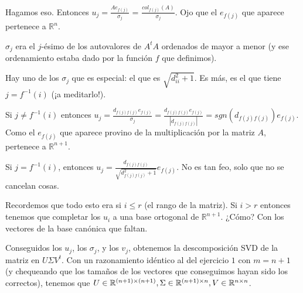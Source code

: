 \documentclass[10pt,a4paper,final]{article}
\begin{document}
Hagamos eso. Entonces $u_j = \frac{A e_{f(j)}}{\sigma_j}$ = $\frac{col_{f(j)}(A)}{\sigma_j}$. Ojo que el $e_{f(j)}$ que aparece pertenece a $\mathbb{R}^n$.

$\sigma_j$ era el $j$-ésimo de los autovalores de $A^t A$ ordenados de mayor a menor (y ese ordenamiento estaba dado por la función $f$ que definimos).

Hay uno de los $\sigma_j$ que es especial: el que es $\sqrt{d_{ii}^2+1}$. Es más, es el que tiene $j= f^{-1}(i)$ (¡a meditarlo!).

Si $j \neq f^{-1}(i)$ entonces $u_j = \frac{d_{f(j)f(j)} e_{f(j)}}{\sigma_j} = \frac{d_{f(j)f(j)} e_{f(j)}}{|d_{f(j)f(j)}|} = sgn(d_{f(j) f(j)}) e_{f(j)}$. Como el $e_{f(j)}$ que aparece provino de la multiplicación por la matriz $A$, pertenece a $\mathbb{R}^{n+1}$.


Si $j= f^{-1}(i)$, entonces $u_j = \frac{d_{f(j)f(j)} }{\sqrt{d_{f(j)f(j)}^2+1}} e_{f(j)}$. No es tan feo, solo que no se cancelan cosas.


Recordemos que todo esto era si $i \leq r$ (el rango de la matriz). Si $i>r$ entonces tenemos que completar los $u_i$ a una base ortogonal de $\mathbb{R}^{n+1}$. ¿Cómo? Con los vectores de la base canónica que faltan.

Conseguidos los $u_j$, los $\sigma_j$, y los $v_j$, obtenemos la descomposición SVD de la matriz en $U \Sigma V^t$. Con un razonamiento idéntico al del ejercicio $1$ con $m=n+1$ (y chequeando que los tamaños de los vectores que conseguimos hayan sido los correctos), tenemos que $U\in \mathbb{R}^{(n+1)\times (n+1)}, \Sigma \in \mathbb{R}^{(n+1)\times n}, V \in \mathbb{R}^{n\times n}$. \bigskip


\end{document}
